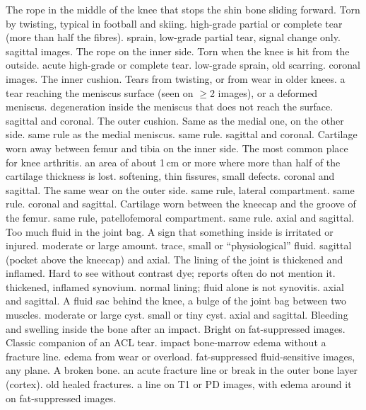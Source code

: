 \begin{tcbraster}[raster columns=2, raster equal height=rows, raster column skip=3mm, raster row skip=2.5mm]
  {The rope in the middle of the knee that stops the shin bone sliding forward. Torn by twisting, typical in football and skiing.}
  {high-grade partial or complete tear (more than half the fibres).}
  {sprain, low-grade partial tear, signal change only.}
  {sagittal images.}
  {The rope on the inner side. Torn when the knee is hit from the outside.}
  {acute high-grade or complete tear.}
  {low-grade sprain, old scarring.}
  {coronal images.}
  {The inner cushion. Tears from twisting, or from wear in older knees.}
  {a tear reaching the meniscus surface (seen on $\geq$2 images), or a deformed meniscus.}
  {degeneration inside the meniscus that does not reach the surface.}
  {sagittal and coronal.}
  {The outer cushion. Same as the medial one, on the other side.}
  {same rule as the medial meniscus.}
  {same rule.}
  {sagittal and coronal.}
  {Cartilage worn away between femur and tibia on the inner side. The most common place for knee arthritis.}
  {an area of about 1\,cm or more where more than half of the cartilage thickness is lost.}
  {softening, thin fissures, small defects.}
  {coronal and sagittal.}
  {The same wear on the outer side.}
  {same rule, lateral compartment.}
  {same rule.}
  {coronal and sagittal.}
  {Cartilage worn between the kneecap and the groove of the femur.}
  {same rule, patellofemoral compartment.}
  {same rule.}
  {axial and sagittal.}
  {Too much fluid in the joint bag. A sign that something inside is irritated or injured.}
  {moderate or large amount.}
  {trace, small or ``physiological'' fluid.}
  {sagittal (pocket above the kneecap) and axial.}
  {The lining of the joint is thickened and inflamed. Hard to see without contrast dye; reports often do not mention it.}
  {thickened, inflamed synovium.}
  {normal lining; fluid alone is not synovitis.}
  {axial and sagittal.}
  {A fluid sac behind the knee, a bulge of the joint bag between two muscles.}
  {moderate or large cyst.}
  {small or tiny cyst.}
  {axial and sagittal.}
  {Bleeding and swelling inside the bone after an impact. Bright on fat-suppressed images. Classic companion of an ACL tear.}
  {impact bone-marrow edema without a fracture line.}
  {edema from wear or overload.}
  {fat-suppressed fluid-sensitive images, any plane.}
  {A broken bone.}
  {an acute fracture line or break in the outer bone layer (cortex).}
  {old healed fractures.}
  {a line on T1 or PD images, with edema around it on fat-suppressed images.}
\end{tcbraster}

